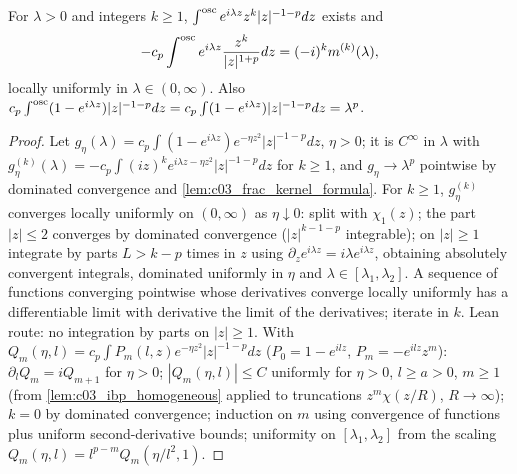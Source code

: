 \begin{lemma}
  \label{lem:c03_frac_moments}
  For $\lambda>0$ and integers $k\ge1$, $\int^{\textup{osc}}e^{i\lambda z}z^k|z|^{-1-p}dz$ exists and
  \begin{equation}\label{eqn:appendix_oscillatory_multiplier_moments}
    -c_p\int^{\textup{osc}}e^{i\lambda z}\frac{z^k}{|z|^{1+p}}dz=(-i)^km^{(k)}(\lambda),
  \end{equation}
  locally uniformly in $\lambda\in(0,\infty)$. Also $c_p\int^{\textup{osc}}(1-e^{i\lambda z})|z|^{-1-p}dz=c_p\int(1-e^{i\lambda z})|z|^{-1-p}dz=\lambda^p$.
\end{lemma}
\begin{proof}
  Let $g_\eta(\lambda)=c_p\int(1-e^{i\lambda z})e^{-\eta z^2}|z|^{-1-p}dz$, $\eta>0$; it is $C^\infty$ in $\lambda$ with $g_\eta^{(k)}(\lambda)=-c_p\int(iz)^ke^{i\lambda z-\eta z^2}|z|^{-1-p}dz$ for $k\ge1$, and $g_\eta\to\lambda^p$ pointwise by dominated convergence and \cref{lem:c03_frac_kernel_formula}.
  For $k\ge1$, $g_\eta^{(k)}$ converges locally uniformly on $(0,\infty)$ as $\eta\downarrow0$: split with $\chi_1(z)$; the part $|z|\le2$ converges by dominated convergence ($|z|^{k-1-p}$ integrable); on $|z|\ge1$ integrate by parts $L>k-p$ times in $z$ using $\partial_ze^{i\lambda z}=i\lambda e^{i\lambda z}$, obtaining absolutely convergent integrals, dominated uniformly in $\eta$ and $\lambda\in[\lambda_1,\lambda_2]$.
  A sequence of functions converging pointwise whose derivatives converge locally uniformly has a differentiable limit with derivative the limit of the derivatives; iterate in $k$.
  Lean route: no integration by parts on $|z|\ge1$. With $Q_m(\eta,l)=c_p\int P_m(l,z)e^{-\eta z^2}|z|^{-1-p}dz$ ($P_0=1-e^{ilz}$, $P_m=-e^{ilz}z^m$): $\partial_lQ_m=iQ_{m+1}$ for $\eta>0$; $|Q_m(\eta,l)|\le C$ uniformly for $\eta>0$, $l\ge a>0$, $m\ge1$ (from \cref{lem:c03_ibp_homogeneous} applied to truncations $z^m\chi(z/R)$, $R\to\infty$); $k=0$ by dominated convergence; induction on $m$ using convergence of functions plus uniform second-derivative bounds; uniformity on $[\lambda_1,\lambda_2]$ from the scaling $Q_m(\eta,l)=l^{p-m}Q_m(\eta/l^2,1)$.
\end{proof}


